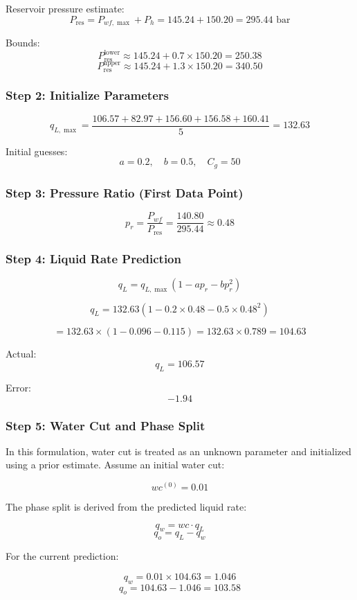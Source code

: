 \documentclass[12pt,APA]{uomthesis}
\begin{document}
Reservoir pressure estimate:
\[
P_{\text{res}} = P_{wf,\max} + P_h = 145.24 + 150.20 = 295.44 \text{ bar}
\]

Bounds:
\[
P_{\text{res}}^{\text{lower}} \approx 145.24 + 0.7 \times 150.20 = 250.38
\]
\[
P_{\text{res}}^{\text{upper}} \approx 145.24 + 1.3 \times 150.20 = 340.50
\]


\subsubsection*{Step 2: Initialize Parameters}
\[
q_{L,\max} = \frac{106.57 + 82.97 + 156.60 + 156.58 + 160.41}{5}
= 132.63
\]

Initial guesses:
\[
a = 0.2, \quad b = 0.5, \quad C_g = 50
\]


\subsubsection*{Step 3: Pressure Ratio (First Data Point)}
\[
p_r = \frac{P_{wf}}{P_{\text{res}}} = \frac{140.80}{295.44} \approx 0.48
\]


\subsubsection*{Step 4: Liquid Rate Prediction}
\[
q_L = q_{L,\max} (1 - a p_r - b p_r^2)
\]

\[
q_L = 132.63 \left(1 - 0.2 \times 0.48 - 0.5 \times 0.48^2 \right)
\]

\[
= 132.63 \times (1 - 0.096 - 0.115)
= 132.63 \times 0.789
= 104.63
\]

Actual:
\[
q_L = 106.57
\]

Error:
\[
-1.94
\]

\subsubsection*{Step 5: Water Cut and Phase Split}
In this formulation, water cut is treated as an unknown parameter and initialized using a prior estimate. Assume an initial water cut:

\[
wc^{(0)} = 0.01
\]

The phase split is derived from the predicted liquid rate:

\[
q_w = wc \cdot q_L
\]
\[
q_o = q_L - q_w
\]

For the current prediction:

\[
q_w = 0.01 \times 104.63 = 1.046
\]
\[
q_o = 104.63 - 1.046 = 103.58
\]
\end{document}
